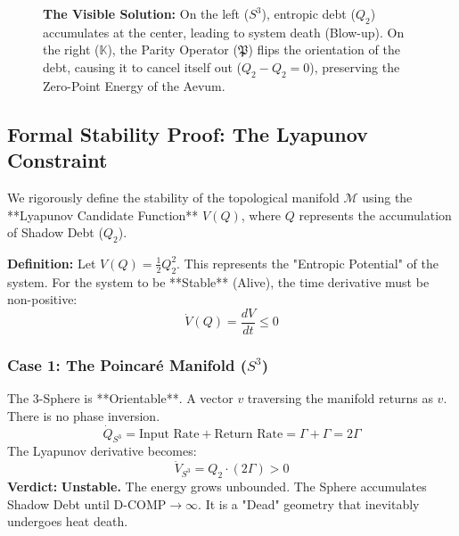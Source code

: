 \documentclass[11pt, letterpaper]{article}
\begin{document}
\begin{figure}[htbp]
    \caption{\textbf{The Visible Solution:} On the left ($S^3$), entropic debt ($Q_2$) accumulates at the center, leading to system death (Blow-up). On the right ($\mathbb{K}$), the Parity Operator ($\mathfrak{P}$) flips the orientation of the debt, causing it to cancel itself out ($Q_2 - Q_2 = 0$), preserving the Zero-Point Energy of the Aevum.}
    \label{fig:alqc_solution}
\end{figure}


\subsection{Formal Stability Proof: The Lyapunov Constraint}
\label{appendixA.7.5}

We rigorously define the stability of the topological manifold $\mathcal{M}$ using the **Lyapunov Candidate Function** $V(Q)$, where $Q$ represents the accumulation of Shadow Debt ($Q_2$).

\textbf{Definition:} Let $V(Q) = \frac{1}{2} Q_2^2$. This represents the "Entropic Potential" of the system.
For the system to be **Stable** (Alive), the time derivative must be non-positive:
\begin{equation}
    \dot{V}(Q) = \frac{dV}{dt} \leq 0
\end{equation}

\subsubsection*{Case 1: The Poincaré Manifold ($S^3$)}
The 3-Sphere is **Orientable**. A vector $v$ traversing the manifold returns as $v$. There is no phase inversion.
\[
\dot{Q}_{S^3} = \text{Input Rate} + \text{Return Rate} = \Gamma + \Gamma = 2\Gamma
\]
The Lyapunov derivative becomes:
\begin{equation}
    \dot{V}_{S^3} = Q_2 \cdot (2\Gamma) > 0
\end{equation}
\textbf{Verdict:} \textbf{Unstable.} The energy grows unbounded. The Sphere accumulates Shadow Debt until $\text{D-COMP} \to \infty$. It is a "Dead" geometry that inevitably undergoes heat death.
\end{document}
